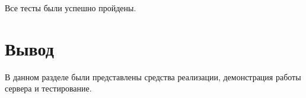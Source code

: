 Все тесты были успешно пройдены.

\section*{Вывод}

В данном разделе были представлены средства реализации, демонстрация работы сервера и тестирование.
